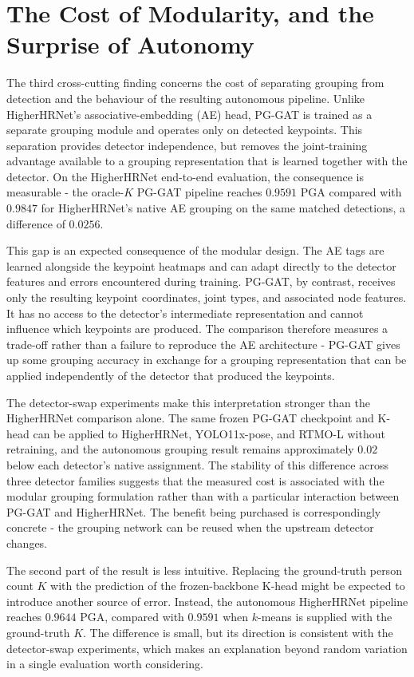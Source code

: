 \section{The Cost of Modularity, and the Surprise of Autonomy}
\label{sec_disc_modularity_autonomy}

The third cross-cutting finding concerns the cost of separating grouping
from detection and the behaviour of the resulting autonomous pipeline.
Unlike HigherHRNet's associative-embedding (AE) head,
PG-GAT is trained as a separate grouping module and operates only on
detected keypoints.
This separation provides detector independence,
but removes the joint-training advantage available to a grouping
representation that is learned together with the detector.
On the HigherHRNet end-to-end evaluation, the consequence is measurable -
the oracle-$K$ PG-GAT pipeline reaches $0.9591$ PGA compared with
$0.9847$ for HigherHRNet's native AE grouping on the same matched
detections,
a difference of $0.0256$.

This gap is an expected consequence of the modular design.
The AE tags are learned alongside the keypoint heatmaps and can adapt
directly to the detector features and errors encountered during training.
PG-GAT, by contrast, receives only the resulting keypoint coordinates,
joint types,
and associated node features.
It has no access to the detector's intermediate representation and cannot
influence which keypoints are produced.
The comparison therefore measures a trade-off rather than a failure to
reproduce the AE architecture -
PG-GAT gives up some grouping accuracy in exchange for a grouping
representation that can be applied independently of the detector that
produced the keypoints.

The detector-swap experiments make this interpretation stronger than
the HigherHRNet comparison alone.
The same frozen PG-GAT checkpoint and K-head can be applied to
HigherHRNet,
YOLO11x-pose,
and RTMO-L without retraining,
and the autonomous grouping result remains approximately $0.02$ below
each detector's native assignment.
The stability of this difference across three detector families
suggests that the measured cost is associated with the modular grouping
formulation rather than with a particular interaction between PG-GAT
and HigherHRNet.
The benefit being purchased is correspondingly concrete -
the grouping network can be reused when the upstream detector changes.

The second part of the result is less intuitive.
Replacing the ground-truth person count $K$ with the prediction of the
frozen-backbone K-head might be expected to introduce another source
of error.
Instead, the autonomous HigherHRNet pipeline reaches $0.9644$ PGA,
compared with $0.9591$ when $k$-means is supplied with the ground-truth
$K$.
The difference is small,
but its direction is consistent with the detector-swap experiments,
which makes an explanation beyond random variation in a
single evaluation worth considering.

